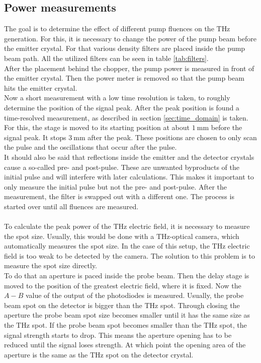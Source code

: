 \subsection{Power measurements}
\label{sec:power}
The goal is to determine the effect of different pump fluences on the $\si{\tera\hertz}$ generation.
For this, it is necessary to change the power of the pump beam before the emitter crystal.
For that various density filters are placed inside the pump beam path.
All the utilized filters can be seen in table \ref{tab:filters}.
\\
After the placement behind the chopper, the pump power is measured in front of the emitter crystal.
Then the power meter is removed so that the pump beam hits the emitter crystal.
\\
Now a short measurement with a low time resolution is taken, to roughly determine the position of the signal peak.
After the peak position is found a time-resolved measurement, as described in section \ref{sec:time_domain} is taken.
For this, the stage is moved to its starting position at about $\SI{1}{\milli\meter}$ before the signal peak.
It stops $\SI{3}{\milli\meter}$ after the peak.
These positions are chosen to only scan the pulse and the oscillations that occur after the pulse.
\\
It should also be said that reflections inside the emitter and the detector crystals cause a so-called pre- and post-pulse.
These are unwanted byproducts of the initial pulse and will interfere with later calculations.
This makes it important to only measure the initial pulse but not the pre- and post-pulse.
After the measurement, the filter is swapped out with a different one.
The process is started over until all fluences are measured.
\\\\
To calculate the peak power of the $\si{\tera\hertz}$ electric field, it is necessary to measure the spot size.
Usually, this would be done with a $\si{\tera\hertz}$-optical camera, which automatically measures the spot size.
In the case of this setup, the $\si{\tera\hertz}$ electric field is too weak to be detected by the camera.
The solution to this problem is to measure the spot size directly.
\\
To do that an aperture is paced inside the probe beam.
Then the delay stage is moved to the position of the greatest electric field, where it is fixed.
Now the $A-B$ value of the output of the photodiodes is measured.
Usually, the probe beam spot on the detector is bigger than the $\si{\tera\hertz}$ spot.
Through closing the aperture the probe beam spot size becomes smaller until it has the same size as the $\si{\tera\hertz}$ spot.
If the probe beam spot becomes smaller than the $\si{\tera\hertz}$ spot, the signal strength starts to drop.
This means the aperture opening has to be reduced until the signal loses strength. 
At which point the opening area of the aperture is the same as the $\si{\tera\hertz}$ spot on the detector crystal.
